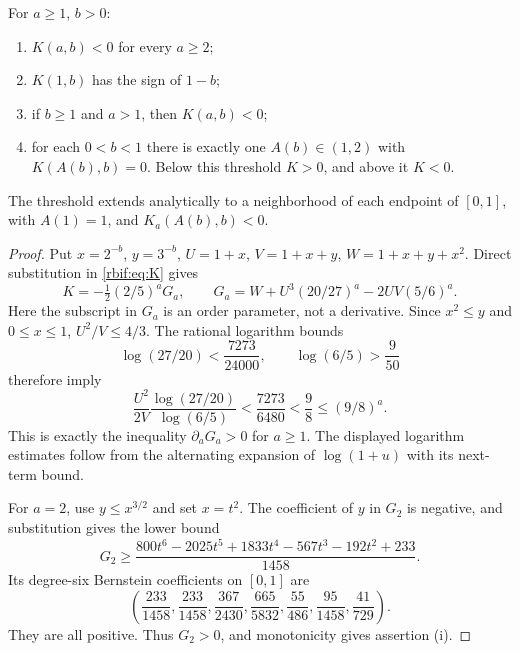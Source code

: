 \begin{theorem}
\label{rbif:thm:quadratic}
For $a\ge1$, $b>0$:
\begin{enumerate}[label=(\roman*)]
\item $K(a,b)<0$ for every $a\ge2$;
\item $K(1,b)$ has the sign of $1-b$;
\item if $b\ge1$ and $a>1$, then $K(a,b)<0$;
\item for each $0<b<1$ there is exactly one $A(b)\in(1,2)$ with
$K(A(b),b)=0$. Below this threshold $K>0$, and above it $K<0$.
\end{enumerate}
The threshold extends analytically to a neighborhood of each endpoint
of $[0,1]$, with $A(1)=1$, and $K_a(A(b),b)<0$.
\end{theorem}
\begin{proof}
Put $x=2^{-b}$, $y=3^{-b}$, $U=1+x$, $V=1+x+y$,
$W=1+x+y+x^2$. Direct substitution in \eqref{rbif:eq:K} gives
\begin{equation}
 K=-\tfrac12(2/5)^a G_a,\qquad
 G_a=W+U^3(20/27)^a-2UV(5/6)^a.
 \label{rbif:eq:Ga}
\end{equation}
Here the subscript in $G_a$ is an order parameter, not a derivative.
Since $x^2\le y$ and $0\le x\le1$,
$U^2/V\le4/3$. The rational logarithm bounds
\[
 \log(27/20)<\frac{7273}{24000},\qquad
 \log(6/5)>\frac9{50}
\]
therefore imply
\[
 \frac{U^2}{2V}\frac{\log(27/20)}{\log(6/5)}
 <\frac{7273}{6480}<\frac98\le(9/8)^a.
\]
This is exactly the inequality $\partial_aG_a>0$ for $a\ge1$.
The displayed logarithm estimates follow from the alternating expansion
of $\log(1+u)$ with its next-term bound.

For $a=2$, use $y\le x^{3/2}$ and set $x=t^2$. The coefficient of $y$
in $G_2$ is negative, and substitution gives the lower bound
\[
 G_2\ge\frac{800t^6-2025t^5+1833t^4-567t^3-192t^2+233}{1458}.
\]
Its degree-six Bernstein coefficients on $[0,1]$ are
\[
 \left(\frac{233}{1458},\frac{233}{1458},\frac{367}{2430},
 \frac{665}{5832},\frac{55}{486},\frac{95}{1458},\frac{41}{729}\right).
\]
They are all positive. Thus $G_2>0$, and monotonicity gives assertion (i).


\end{proof}
